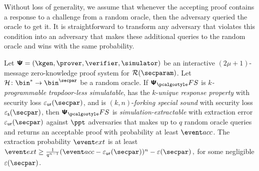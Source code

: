 Without loss of generality, we assume that whenever the accepting proof contains
a response to a challenge from a random oracle, then the adversary queried the
oracle to get it. It is straightforward to transform any adversary that violates
this condition into an adversary that makes these additional queries to the
random oracle and wins with the same probability.


\begin{theorem}
  \label{thm:se}
  Let $\ps = (\kgen, \prover, \verifier, \simulator)$ be an interactive
  $(2 \mu + 1)$-message zero-knowledge proof system for $\RELGEN(\secparam)$. Let
  $\ro\colon \bin^{*} \to \bin^{\secpar}$ be a random oracle. If $\psfs$ is
  \emph{$k$-programmable trapdoor-less simulatable}, has the $k$-\emph{unique
    response property} with security loss $\epsur(\secpar)$, and is
  $(k, n)$-\emph{forking special sound} with security loss $\epss(\secpar)$, then
  $\psfs$ is \emph{simulation-extractable} with extraction error
  $\epsur(\secpar)$ against $\ppt$ adversaries that makes up to $q$ random oracle
  queries and returns an acceptable proof with probability at least $\accProb$.  The
  extraction probability $\extProb$ is at least
  \( \extProb \geq \frac{1}{q^{n - 1}} (\accProb - \epsur(\secpar))^{n}
  -\eps(\secpar)\,, \) for some negligible $\eps(\secpar)$.
\end{theorem}
